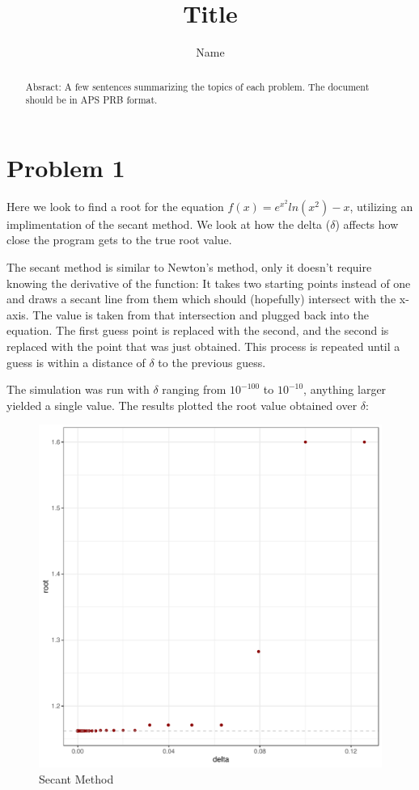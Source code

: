 \documentclass[prb,twocolumn]{revtex4-2}
\begin{document}
\title{Title}

\author{Name}


\begin{abstract}
Absract: A few sentences summarizing the topics of each problem.  The document should be in APS PRB format.  
\end{abstract}

\maketitle

\section{Problem 1}

\noindent
Here we look to find a root for the equation $f(x)=e^{x^2}ln(x^2)-x$, utilizing an implimentation of the secant method. We look at how the delta ($\delta$) affects how close the program gets to the true root value.

The secant method is similar to Newton's method, only it doesn't require knowing the derivative of the function: It takes two starting points instead of one and draws a secant line from them which should (hopefully) intersect with the x-axis. The value is taken from that intersection and plugged back into the equation. The first guess point is replaced with the second, and the second is replaced with the point that was just obtained. This process is repeated until a guess is within a distance of $\delta$ to the previous guess.

The simulation was run with $\delta$ ranging from $10^{-100}$ to $10^{-10}$, anything larger yielded a single value. The results plotted the root value obtained over $\delta$:

\begin{figure}[h!]
\centerline{\includegraphics [width=3 in] {secant}} \caption{Secant Method} \label{Secant Method}
\end{figure}
\end{document}
